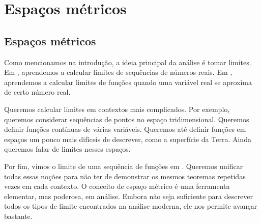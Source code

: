 \chapter{Espaços métricos} \label{ms:chapter}


\section{Espaços métricos}
\label{sec:metric}


Como mencionamos na introdução, a ideia principal da análise é tomar
limites. Em , aprendemos a calcular limites de
sequências de números reais. Em , aprendemos a
calcular limites de funções quando uma variável real se aproxima de certo
número real.

Queremos calcular limites em contextos mais complicados. Por exemplo,
queremos considerar sequências de pontos no espaço tridimensional.
Queremos definir funções contínuas de várias variáveis.
Queremos até definir funções em espaços um pouco mais difíceis de descrever,
como a superfície da Terra. Ainda queremos falar de limites nesses espaços.

Por fim, vimos o limite de uma sequência de funções em
.
Queremos unificar todas essas noções para não ter de demonstrar os mesmos
teoremas repetidas vezes em cada contexto. O conceito de espaço métrico é
uma ferramenta elementar, mas poderosa, em análise. Embora não seja suficiente
para descrever todos os tipos de limite encontrados na análise moderna, ele
nos permite avançar bastante.

